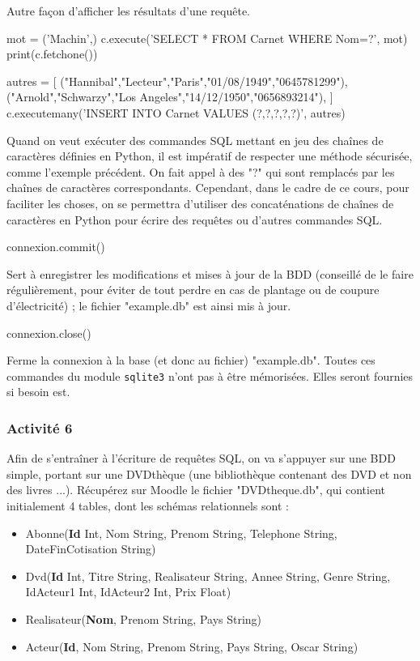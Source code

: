 \documentclass[11pt,a4paper,french,twoside]{PMCours}
\begin{document}
\pagebreak
Autre façon d'afficher les résultats d'une requête.


\begin{Python}
mot = ('Machin',)
c.execute('SELECT * FROM Carnet WHERE Nom=?', mot)
print(c.fetchone())

autres = [
          ("Hannibal","Lecteur","Paris","01/08/1949","0645781299"),
          ("Arnold","Schwarzy","Los Angeles","14/12/1950","0656893214"),
         ]
c.executemany('INSERT INTO Carnet VALUES (?,?,?,?,?)', autres)
\end{Python}
Quand on veut exécuter des commandes SQL mettant en jeu des chaînes de caractères définies en Python, il est impératif de respecter une méthode sécurisée, comme l'exemple précédent. On fait appel à des "?" qui sont remplacés par les chaînes de caractères correspondants. Cependant, dans le cadre de ce cours, pour faciliter les choses, on se permettra d'utiliser des concaténations de chaînes de caractères en Python pour écrire des requêtes ou d'autres commandes SQL.

\begin{Python}
connexion.commit()
\end{Python}
Sert à enregistrer les modifications et mises à jour de la BDD (conseillé de le faire régulièrement, pour éviter de tout perdre en cas de plantage ou de coupure d'électricité) ; le fichier "example.db" est ainsi mis à jour.

\begin{Python}
connexion.close()
\end{Python}
Ferme la connexion à la base (et donc au fichier) "example.db". Toutes ces commandes du module \verb'sqlite3' n'ont pas à être mémorisées. Elles seront fournies si besoin est.



\subsubsection*{Activité 6}

Afin de s'entraîner à l'écriture de requêtes SQL, on va s'appuyer sur une BDD simple, portant sur une DVDthèque (une bibliothèque contenant des DVD et non des livres ...). Récupérez sur Moodle le fichier "DVDtheque.db", qui contient initialement 4 tables, dont les schémas relationnels sont :
\begin{itemize}
 \item Abonne(\textbf{Id} Int, Nom String, Prenom String, Telephone String, DateFinCotisation String)
 \item Dvd(\textbf{Id} Int, Titre String, Realisateur String, Annee String, Genre String, IdActeur1 Int, IdActeur2 Int, Prix Float)
 \item Realisateur(\textbf{Nom}, Prenom String, Pays String)
 \item Acteur(\textbf{Id}, Nom String, Prenom String, Pays String, Oscar String)
\end{itemize}
\end{document}
